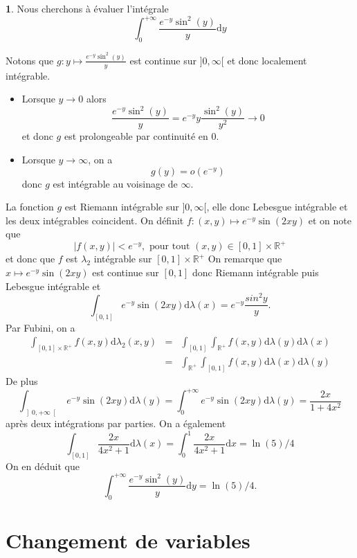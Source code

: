 \documentclass[8pt,notheorems]{beamer}
\def \R{\mathbb{R}}
\theoremstyle{definition}
\theoremstyle{example}
\newtheorem{example}{\translate{Exemple}}
\theoremstyle{mystyle}
\theoremstyle{plain}
\begin{document}
\begin{frame}[allowframebreaks]
\begin{example}
Nous cherchons à évaluer l'intégrale 
$$
\int_{0}^{+\infty}\frac{e^{-y}\sin^2(y)}{y}\text{d}y
$$
\end{example}
Notons que $g:y\mapsto \frac{e^{-y}\sin^2(y)}{y}$ est continue sur $]0,\infty[$ et donc localement intégrable. 
\begin{itemize}
    \item Lorsque $y\rightarrow 0$ alors
    $$
    \frac{e^{-y}\sin^2(y)}{y}=e^{-y}y\frac{\sin^2(y)}{y^2}\rightarrow 0
    $$
    et donc $g$ est prolongeable par continuité en $0$.
    \item Lorsque $y\rightarrow\infty$, on a 
    $$
    g(y) = o(e^{-y})
    $$
    donc $g$ est intégrable au voisinage de $\infty$.
\end{itemize}
La fonction $g$ est Riemann intégrable sur $]0,\infty[$, elle donc
Lebesgue intégrable et les deux intégrables coincident. 
On définit $f:(x,y)\mapsto e^{-y}\sin(2xy)$ et on note que 
$$
|f(x,y)|<e^{-y},\text{ pour tout }(x,y)\in [0,1]\times \R^{+}
$$
et donc que $f$ est $\lambda_2$ intégrable sur $[0,1]\times \R^{+}$ On remarque que $x\mapsto e^{-y}\sin(2xy)$ est continue sur $[0,1]$ donc Riemann intégrable puis Lebesgue intégrable et 
$$
\int_{[0,1]}e^{-y}\sin(2xy)\text{d}\lambda(x) =  e^{-y}\frac{sin^2 y}{y}. 
$$
Par Fubini, on a 
\begin{eqnarray*}
\int_{[0,1]\times \R^+} f(x,y)\text{d}\lambda_2(x,y) &=&\int_{[0,1]}\int_{\R^+} f(x,y)\text{d}\lambda(y)\text{d}\lambda(x)\\
&=&\int_{\R^+} \int_{[0,1]}f(x,y)\text{d}\lambda(x) \text{d}\lambda(y) 
\end{eqnarray*}
De plus 
$$
\int_{\left]0,+\infty\right[}e^{-y}\sin(2xy)\text{d}\lambda(y) = \int_{0}^{+\infty}e^{-y}\sin(2xy)\text{d}\lambda(y) = \frac{2x}{1+4x^2}
$$
après deux intégrations par parties. On a également 
$$
\int_{[0,1]}\frac{2x}{4x^2+1}\text{d}\lambda(x) =\int_{0}^1\frac{2x}{4x^2+1}\text{d}x = \ln(5)/ 4 
$$ 
On en déduit que 
$$
\int_{0}^{+\infty}\frac{e^{-y}\sin^2(y)}{y}\text{d}y = \ln(5)/ 4 .
$$
\end{frame}
\section{Changement de variables}
\end{document}
